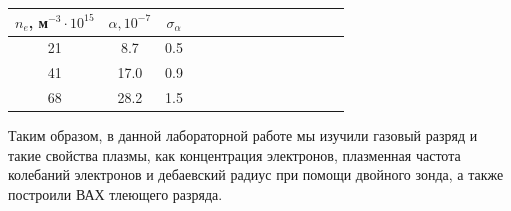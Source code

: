 \documentclass[14pt]{article}
\begin{document}
\begin{center}
\begin{tabular}{|c|c|c|c|c|c|c|c|c|c|c|c|c|c|}
\hline
$n_e$, м$^{-3}\cdot10^{15}$	&	$\alpha, 10^{-7}$ 	&	$\sigma_\alpha$	\\
\hline
21							&	8.7					&	0.5				\\
\hline
41							&	17.0				&	0.9				\\
\hline
68							&	28.2				&	1.5				\\
\hline
\end{tabular}
\end{center}

\newpage
Таким образом, в данной лабораторной работе мы изучили газовый разряд и такие свойства плазмы, как концентрация электронов, плазменная частота колебаний электронов и дебаевский радиус при помощи двойного зонда, а также построили ВАХ тлеющего разряда.
\end{document}
